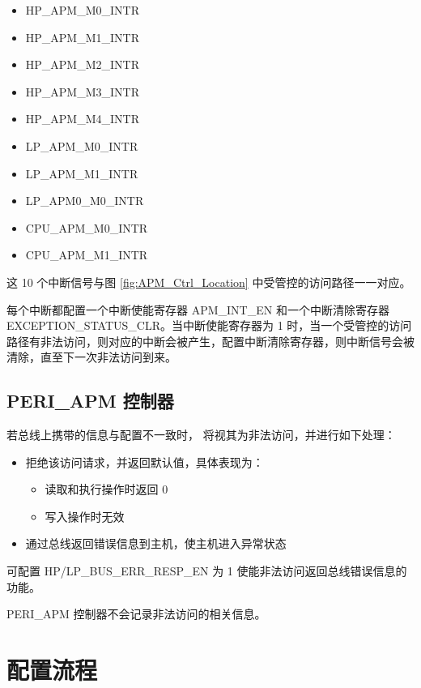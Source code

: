 \documentclass[main\_\_CN.tex]{subfiles}
\begin{document}
\begin{itemize}
    \item HP\_APM\_M0\_INTR
    \item HP\_APM\_M1\_INTR
    \item HP\_APM\_M2\_INTR
    \item HP\_APM\_M3\_INTR
    \item HP\_APM\_M4\_INTR
    \item LP\_APM\_M0\_INTR
    \item LP\_APM\_M1\_INTR
    \item LP\_APM0\_M0\_INTR
    \item CPU\_APM\_M0\_INTR
    \item CPU\_APM\_M1\_INTR
\end{itemize}

这 10 个中断信号与图 \ref{fig:APM_Ctrl_Location} 中受管控的访问路径一一对应。

每个中断都配置一个中断使能寄存器 APM\_INT\_EN 和一个中断清除寄存器 EXCEPTION\_STATUS\_CLR。当中断使能寄存器为 1 时，当一个受管控的访问路径有非法访问，则对应的中断会被产生，配置中断清除寄存器，则中断信号会被清除，直至下一次非法访问到来。

\subsection{PERI\_APM 控制器}

若总线上携带的信息与配置不一致时，\chipname{} 将视其为非法访问，并进行如下处理：

\begin{itemize}
    \item 拒绝该访问请求，并返回默认值，具体表现为：
    \begin{itemize}
        \item 读取和执行操作时返回 0
        \item 写入操作时无效
    \end{itemize}
    \item 通过总线返回错误信息到主机，使主机进入异常状态
\end{itemize}

可配置 HP/LP\_BUS\_ERR\_RESP\_EN 为 1 使能非法访问返回总线错误信息的功能。

PERI\_APM 控制器不会记录非法访问的相关信息。

\section{配置流程}
\end{document}
